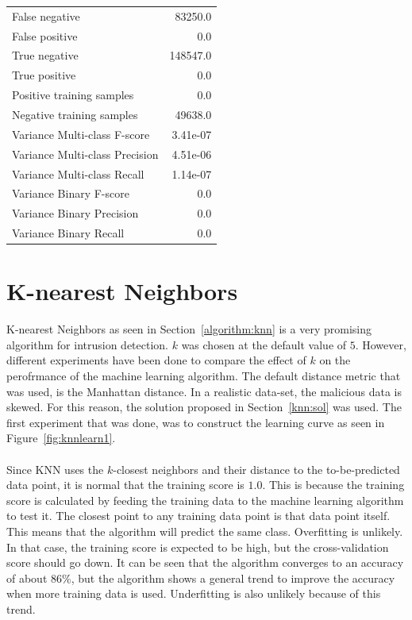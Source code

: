 \begin{table}[H]
\begin{minipage}{0.5\textwidth}
\begin{tabular}{l r}
False negative & 83250.0 \\
False positive & 0.0 \\
True negative & 148547.0 \\
True positive & 0.0 \\
\midrule
Positive training samples & 0.0 \\
Negative training samples & 49638.0 \\
\midrule
Variance Multi-class F-score & 3.41e-07 \\
Variance Multi-class Precision & 4.51e-06 \\
Variance Multi-class Recall & 1.14e-07 \\
\midrule
Variance Binary F-score & 0.0 \\
Variance Binary Precision & 0.0 \\
Variance Binary Recall & 0.0 \\
\bottomrule
\end{tabular}
\end{minipage}
\end{table}

\section{K-nearest Neighbors}
\label{eval:knn}
K-nearest Neighbors as seen in Section~\ref{algorithm:knn} is a very promising algorithm for intrusion detection. $k$ was chosen at the default value of $5$.  However, different experiments have been done to compare the effect of $k$ on the perofrmance of the machine learning algorithm. The default distance metric that was used, is the Manhattan distance. In a realistic data-set, the malicious data is skewed. For this reason, the solution proposed in Section~\ref{knn:sol} was used. The first experiment that was done, was to construct the learning curve as seen in Figure~\ref{fig:knnlearn1}. \\
\\
Since KNN uses the $k$-closest neighbors and their distance to the to-be-predicted data point, it is normal that the training score is $1.0$. This is because the training score is calculated by feeding the training data to the machine learning algorithm to test it. The closest point to any training data point is that data point itself. This means that the algorithm will predict the same class. Overfitting is unlikely. In that case, the training score is expected to be high, but the cross-validation score should go down. It can be seen that the algorithm converges to an accuracy of about 86\%, but the algorithm shows a general trend to improve the accuracy when more training data is used. Underfitting is also unlikely because of this trend. 

